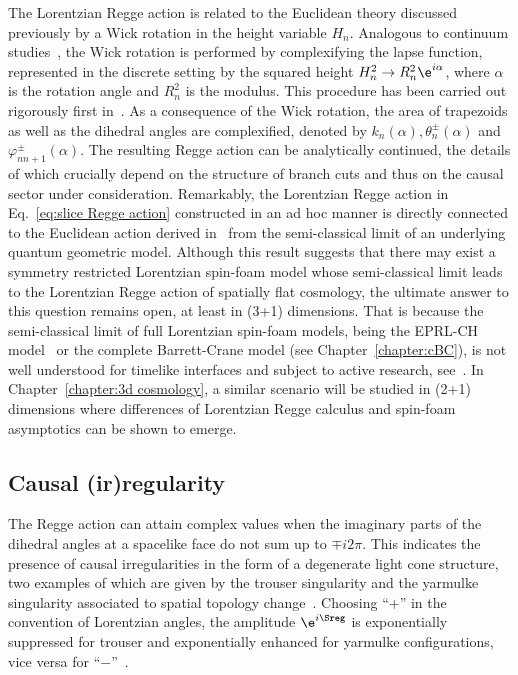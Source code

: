 The Lorentzian Regge action is related to the Euclidean theory discussed previously by a Wick rotation in the height variable $H_n$.  Analogous to continuum studies~\cite{Feldbrugge:2017kzv}, the Wick rotation is performed by complexifying the lapse function, represented in the discrete setting by the squared height $H_n^2\rightarrow R_n^2\e^{i\alpha}$, where $\alpha$ is the rotation angle and $R_n^2$ is the modulus. This procedure has been carried out rigorously first in~\cite{Asante:2021phx}. As a consequence of the Wick rotation, the area of trapezoids as well as the dihedral angles are complexified, denoted by $k_n(\alpha),\theta^\pm_n(\alpha)$ and $\varphi^\pm_{nn+1}(\alpha)$. The resulting Regge action can be analytically continued, the details of which crucially depend on the structure of branch cuts and thus on the causal sector under consideration. Remarkably, the Lorentzian Regge action in Eq.~\eqref{eq:slice Regge action} constructed in an ad hoc manner is directly connected to the Euclidean action derived in~\cite{Bahr:2017eyi} from the semi-classical limit of an underlying quantum geometric model. Although this result suggests that there may exist a symmetry restricted Lorentzian spin-foam model whose semi-classical limit leads to the Lorentzian Regge action of spatially flat cosmology, the ultimate answer to this question remains open, at least in (3+1) dimensions. That is because the semi-classical limit of full Lorentzian spin-foam models, being the EPRL-CH model~\cite{Conrady:2010vx,Conrady:2010kc} or the complete Barrett-Crane model (see Chapter~\ref{chapter:cBC}), is not well understood for timelike interfaces and subject to active research, see~\cite{Simao:2021qno}. In Chapter~\ref{chapter:3d cosmology}, a similar scenario will be studied in (2+1) dimensions where differences of Lorentzian Regge calculus and spin-foam asymptotics can be shown to emerge.

\subsection{Causal (ir)regularity}\label{sec:causal regularity}

The Regge action can attain complex values when the imaginary parts of the dihedral angles at a spacelike face do not sum up to $\mp i2\pi$. This indicates the presence of causal irregularities in the form of a degenerate light cone structure, two examples of which are given by the trouser singularity and the yarmulke singularity associated to spatial topology change~\cite{Horowitz:1990qb,Louko:1995jw,Dowker:1999wu}. Choosing \enquote{$+$} in the convention of Lorentzian angles, the amplitude $\e^{i\Sreg}$ is exponentially suppressed for trouser and exponentially enhanced for yarmulke configurations, vice versa for \enquote{$-$}~\cite{Asante:2021zzh}.  

